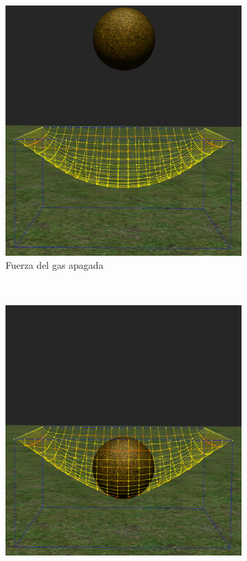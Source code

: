 \begin{figure}
 \centering
  \begin{subfigure}[b]{0.45\textwidth}
    \includegraphics[width=\textwidth]{img/04/modPress1}
    \caption{Fuerza del gas apagada}
    \label{pres:test1}
  \end{subfigure}
~
  \begin{subfigure}[b]{0.45\textwidth}
    \includegraphics[width=\textwidth]{img/04/modPress2}

\end{subfigure}
\end{figure}
